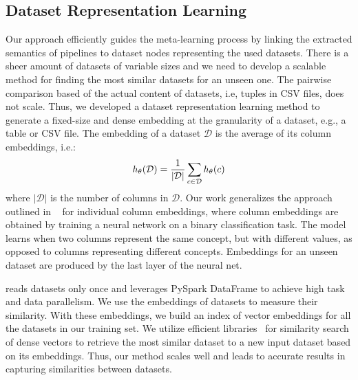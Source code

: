 \subsection{Dataset Representation Learning}
Our approach efficiently guides the meta-learning process by linking the extracted semantics of pipelines to dataset nodes representing the used datasets. There is a sheer amount of datasets of variable sizes and we need to develop a scalable method for finding the most similar datasets for an unseen one. The pairwise comparison based of the actual content of datasets, i.e, tuples in CSV files, does not scale. Thus, we developed a dataset representation learning method to generate a fixed-size and dense embedding at the granularity of a dataset, e.g., a table or CSV file. The embedding of a dataset $\mathcal{D}$ is the average of its column embeddings, i.e.:
\begin{equation}
\ncp\ncp
\label{equation_dataset_embedding}
    h_{\theta}(\mathcal{D}) = \frac{1}{|\mathcal{D}|} \sum_{c \in \mathcal{D}}{h_\theta(c)}
\end{equation}
where $|\mathcal{D}|$ is the number of columns in $\mathcal{D}$. Our work generalizes the approach outlined in ~\cite{Mueller2019RecognizingVF} for individual column embeddings, where column embeddings are obtained by training a neural network on a binary classification task.  The model learns when two columns represent the same concept, but with different values, as opposed to columns representing different concepts.  Embeddings for an unseen dataset are produced by the last layer of the neural net.



{\sysname} reads datasets only once and leverages PySpark DataFrame to achieve high task and data parallelism.
We use the embeddings of datasets to measure their similarity. With these embeddings, we build an index of vector embeddings for all the datasets in our training set. We utilize efficient libraries~\cite{JDH17} for similarity search of dense vectors to retrieve the most similar dataset to a new input dataset based on its embeddings. Thus, our method scales well and leads to accurate results in capturing similarities between datasets.   



